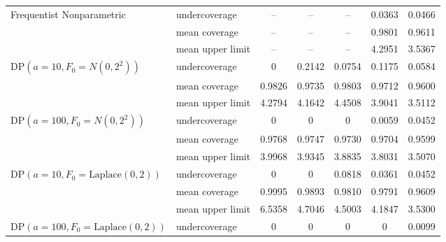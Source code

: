 \documentclass[11pt]{article}
\begin{document}
\begin{table}[htbp]
{\begin{tabular}{l l | c c c c c}
Frequentist Nonparametric
 & undercoverage & -- & -- & -- & 0.0363 & 0.0466 \\
 & mean coverage  & --  & -- & -- & 0.9801 & 0.9611 \\
 & mean upper limit & -- & -- & -- & 4.2951 & 3.5367 \\
\hline
DP$(a=10,F_0 = N(0,2^2))$
 & undercoverage  & 0 & 0.2142 & 0.0754 & 0.1175 & 0.0584 \\
 & mean coverage  & 0.9826 & 0.9735 & 0.9803 & 0.9712 & 0.9600 \\
 & mean upper limit & 4.2794 & 4.1642 & 4.4508 & 3.9041 & 3.5112 \\
DP$(a=100,F_0 = N(0,2^2))$
 & undercoverage & 0 & 0 & 0 & 0.0059 & 0.0452 \\
 & mean coverage  & 0.9768 & 0.9747 & 0.9730 & 0.9704 & 0.9599 \\
 & mean upper limit & 3.9968 & 3.9345 & 3.8835 & 3.8031 & 3.5070 \\
DP$(a=10,F_0 = \text{Laplace}(0,2))$
 & undercoverage & 0 & 0 & 0.0818 & 0.0361 & 0.0452 \\
 & mean coverage  & 0.9995 & 0.9893 & 0.9810 & 0.9791 & 0.9609 \\
 & mean upper limit & 6.5358 & 4.7046 & 4.5003 & 4.1847 & 3.5300 \\
DP$(a=100,F_0 = \text{Laplace}(0,2))$
 & undercoverage & 0 & 0 & 0 & 0 & 0.0099 \\

\end{tabular}}
\end{table}
\end{document}
